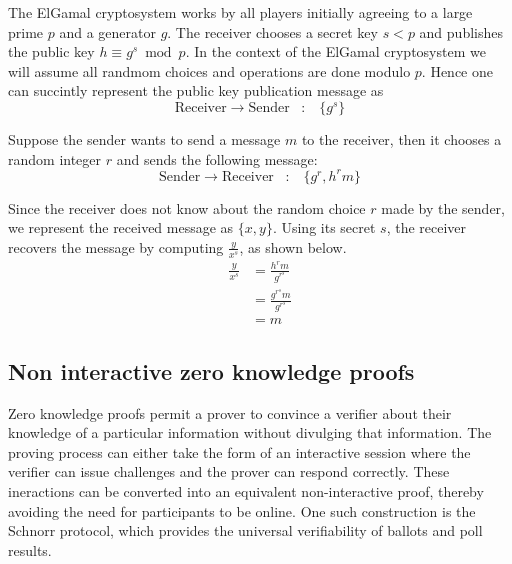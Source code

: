 The ElGamal cryptosystem works by all players initially agreeing to a large prime $p$
and a generator $g$.  The receiver chooses a secret key $s < p$ and publishes
the public key $h \equiv g^s \bmod p$.  In the context of the ElGamal cryptosystem
we will assume all randmom choices and operations are done
modulo $p$.  Hence one can succintly represent the
public key publication message as
\[
\text{Receiver} \rightarrow \text{Sender} \hspace{10pt} : \hspace{10pt} \{g^s\}  
\]

Suppose the sender wants to send a message $m$ to the receiver, then it chooses
a random integer $r$ and sends the following message:
\[
\text{Sender} \rightarrow \text{Receiver} \hspace{10pt} : \hspace{10pt} \{g^r, h^rm\}
\]

Since the receiver does not know about the random choice $r$ made by the sender, we
represent the received message as $\{x, y\}$.  Using its secret $s$, the receiver recovers
the message by computing $\frac{y}{x^s}$, as shown below.
\begin{equation} \label{eq1}
\begin{split}
\frac{y}{x^s} & = \frac{h^rm}{g^{r^s}} \\
              & = \frac{g^{r^s}m}{g^{r^s}}\\
              & = m
\end{split}
\end{equation}

\subsection{Non interactive zero knowledge proofs}

Zero knowledge proofs permit a prover to convince a verifier about their knowledge
of a particular information without divulging that information.  The proving
process can either take the form of an interactive session where the verifier
can issue challenges and the prover can respond correctly.  These ineractions can
be converted into an equivalent non-interactive proof, thereby avoiding the need for participants
to be online.  One such construction is the Schnorr protocol, which 
provides the universal verifiability of ballots and poll results.


